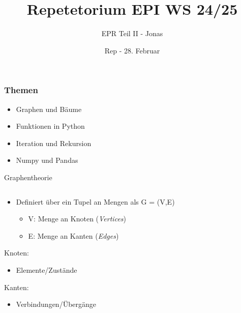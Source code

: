 \documentclass[aspectratio=169]{beamer}
\title[EPR Teil II - Jonas] %
{Repetetorium EPI WS 24/25} %
\author{EPR Teil II - Jonas}
\institute{
Graphen \& Bäume\\
Funktionen, Iteration \& Rekursion\\
NumPy \& Pandas}
\date[28 Februar 2025]  %
{Rep - 28. Februar} %
\begin{document}
\begin{frame}[plain]
  \titlepage
\end{frame}

\begin{frame}
  \frametitle{Themen}
  \begin{itemize}
      \item Graphen und Bäume
      \item Funktionen in Python
      \item Iteration und Rekursion
      \item Numpy und Pandas
  \end{itemize}
\end{frame}

\begin{frame}{Graphentheorie}
  \begin{columns}
    \hspace*{1cm}\begin{column}{0.64\textwidth}
      \begin{itemize}
        \item Definiert über ein Tupel an Mengen als G = (V,E)
        \begin{itemize}
            \item V: Menge an Knoten (\textit{Vertices})
            \item E: Menge an Kanten (\textit{Edges})
        \end{itemize}
      \end{itemize}
      \pause

      Knoten:
      \begin{itemize}
        \item Elemente/Zustände
      \end{itemize}

      Kanten:
      \begin{itemize}
          \item Verbindungen/Übergänge
      \end{itemize}
    \end{column}
    
    \begin{column}{0.25\textwidth}
      \centering
    \end{column}
  \end{columns}
\end{frame}
\end{document}
